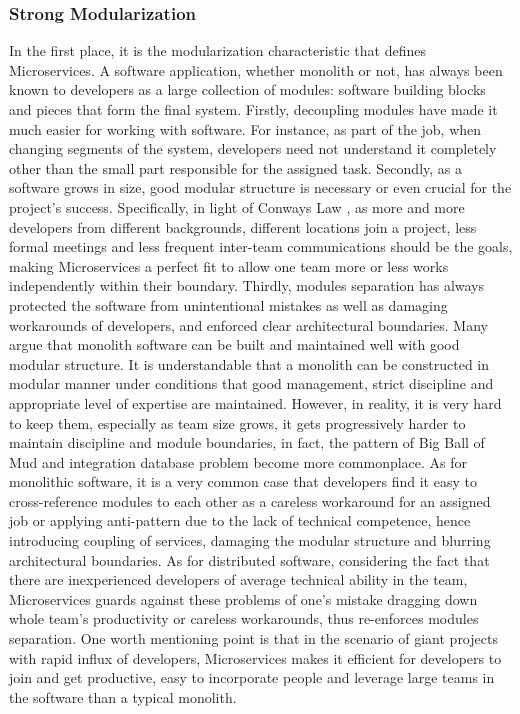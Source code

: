 \documentclass[a4paper]{book}
\begin{document}
\subsubsection{Strong Modularization}
In the first place, it is the modularization characteristic that defines Microservices. A software application, whether monolith or not, has always been known to developers as a large collection of modules: software building blocks and pieces that form the final system. Firstly, decoupling modules have made it much easier for working with software. For instance, as part of the job, when changing segments of the system, developers need not understand it completely other than the small part responsible for the assigned task. Secondly, as a software grows in size, good modular structure is necessary or even crucial for the project's success. Specifically, in light of Conways Law \cite{ConwayLaw}, as more and more developers from different backgrounds, different locations join a project, less formal meetings and less frequent inter-team communications should be the goals, making Microservices a perfect fit to allow one team more or less works independently within their boundary. Thirdly, modules separation has always protected the software from unintentional mistakes as well as damaging workarounds of developers, and enforced clear architectural boundaries. Many argue that monolith software can be built and maintained well with good modular structure. It is understandable that a monolith can be constructed in modular manner under conditions that good management, strict discipline and appropriate level of expertise are maintained. However, in reality, it is very hard to keep them, especially as team size grows, it gets progressively harder to maintain discipline and module boundaries, in fact, the pattern of Big Ball of Mud \cite{BigBallofMud} and integration database \cite{IntegrationDatabase} problem become more commonplace. As for monolithic software, it is a very common case that developers find it easy to cross-reference modules to each other as a careless workaround for an assigned job or applying anti-pattern due to the lack of technical competence, hence introducing coupling of services, damaging the modular structure and blurring architectural boundaries. As for distributed software, considering the fact that there are inexperienced developers of average technical ability in the team, Microservices guards against these problems of one's mistake dragging down whole team's productivity or careless workarounds, thus re-enforces modules separation. One worth mentioning point is that in the scenario of giant projects with rapid influx of developers, Microservices makes it efficient for developers to join and get productive, easy to incorporate people and leverage large teams in the software than a typical monolith. \cite{Lew14, MTO}
\end{document}
